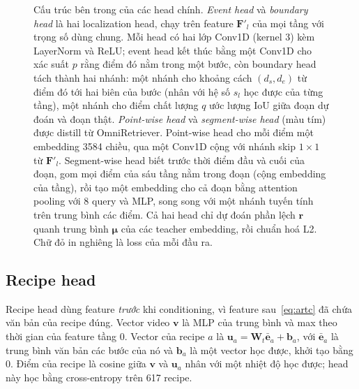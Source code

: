 \documentclass{IEEEtran}
\begin{document}
\begin{figure}[t]
\centering
\resizebox{\textwidth}{!}{}
\caption{Cấu trúc bên trong của các head chính. \emph{Event head} và \emph{boundary head} là hai localization head, chạy trên feature $\mathbf{F}'_l$ của mọi tầng với trọng số dùng chung. Mỗi head có hai lớp Conv1D (kernel 3) kèm LayerNorm và ReLU; event head kết thúc bằng một Conv1D cho xác suất $p$ rằng điểm đó nằm trong một bước, còn boundary head tách thành hai nhánh: một nhánh cho khoảng cách $(d_s, d_e)$ từ điểm đó tới hai biên của bước (nhân với hệ số $s_l$ học được của từng tầng), một nhánh cho điểm chất lượng $q$ ước lượng IoU giữa đoạn dự đoán và đoạn thật. \emph{Point-wise head} và \emph{segment-wise head} (màu tím) được distill từ OmniRetriever. Point-wise head cho mỗi điểm một embedding 3584 chiều, qua một Conv1D cộng với nhánh skip $1{\times}1$ từ $\mathbf{F}'_l$. Segment-wise head biết trước thời điểm đầu và cuối của đoạn, gom mọi điểm của sáu tầng nằm trong đoạn (cộng embedding của tầng), rồi tạo một embedding cho cả đoạn bằng attention pooling với 8 query và MLP, song song với một nhánh tuyến tính trên trung bình các điểm. Cả hai head chỉ dự đoán phần lệch $\mathbf{r}$ quanh trung bình $\boldsymbol{\mu}$ của các teacher embedding, rồi chuẩn hoá L2. Chữ đỏ in nghiêng là loss của mỗi đầu ra.}
\label{fig:heads}
\end{figure}

\subsection{Recipe head}
Recipe head dùng feature \emph{trước} khi conditioning, vì feature sau~\eqref{eq:artc} đã chứa văn bản của recipe đúng. Vector video $\mathbf{v}$ là MLP của trung bình và max theo thời gian của feature tầng 0. Vector của recipe $a$ là $\mathbf{u}_a = \mathbf{W}_t \bar{\mathbf{e}}_a + \mathbf{b}_a$, với $\bar{\mathbf{e}}_a$ là trung bình văn bản các bước của nó và $\mathbf{b}_a$ là một vector học được, khởi tạo bằng 0. Điểm của recipe là cosine giữa $\mathbf{v}$ và $\mathbf{u}_a$ nhân với một nhiệt độ học được; head này học bằng cross-entropy trên 617 recipe.
\end{document}
